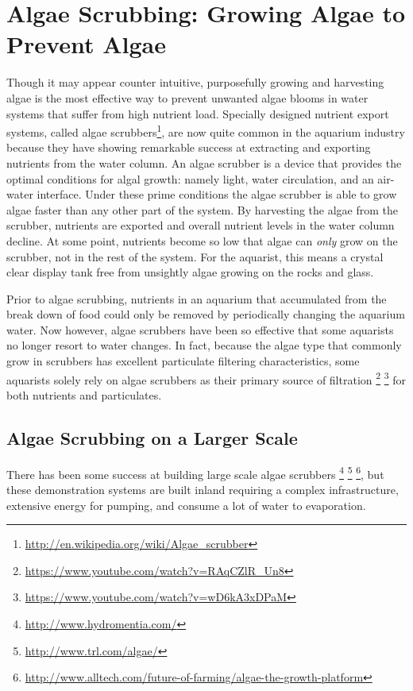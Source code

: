 \documentclass{article}
\begin{document}
\section{Algae Scrubbing: Growing Algae to Prevent Algae}

Though it may appear counter intuitive,
purposefully growing and harvesting algae is the
most effective way to prevent unwanted algae blooms
in water systems that suffer from high nutrient load.
Specially designed nutrient export systems,
called algae scrubbers\footnote{\url{http://en.wikipedia.org/wiki/Algae_scrubber}},
are now quite common in the aquarium industry because they have showing remarkable success
at extracting and exporting nutrients from the water column.
An algae scrubber is a device that provides the 
optimal conditions for algal growth: namely light,
water circulation, and an air-water interface.
Under these prime conditions the algae scrubber is able to
grow algae faster than any other part of the system.
By harvesting the algae from the scrubber, nutrients 
are exported and overall nutrient levels in the water column decline.
At some point, nutrients become so low that algae can \textit{only}
grow on the scrubber, not in the rest of the system.
For the aquarist, this means a crystal clear display tank
free from unsightly algae growing on the rocks and glass.

Prior to algae scrubbing, nutrients in an aquarium
that accumulated from the break down of food
could only be removed by periodically changing the aquarium water.
Now however, algae scrubbers have been so effective that
some aquarists no longer resort to water changes.
In fact, because the algae type that commonly grow
in scrubbers has excellent particulate filtering characteristics,
some aquarists solely rely on algae scrubbers as their primary source of filtration%
\footnote{\url{https://www.youtube.com/watch?v=RAqCZlR\_Un8}}%
\footnote{\url{https://www.youtube.com/watch?v=wD6kA3xDPaM}}
for both nutrients and particulates.

\subsection{Algae Scrubbing on a Larger Scale}

There has been some success at building large scale algae scrubbers%
\footnote{\url{http://www.hydromentia.com/}}%
\footnote{\url{http://www.trl.com/algae/}}%
\footnote{\url{http://www.alltech.com/future-of-farming/algae-the-growth-platform}},
but these demonstration systems are built inland requiring
a complex infrastructure, extensive energy for pumping,
and consume a lot of water to evaporation.
\end{document}
